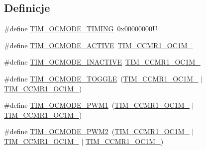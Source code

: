 \subsection*{Definicje}
\begin{DoxyCompactItemize}
\item 
\#define \hyperlink{group___t_i_m___output___compare__and___p_w_m__modes_gafae6b98b4b854fbfffd9a5ebc59c8f61}{T\+I\+M\+\_\+\+O\+C\+M\+O\+D\+E\+\_\+\+T\+I\+M\+I\+NG}~0x00000000U
\item 
\#define \hyperlink{group___t_i_m___output___compare__and___p_w_m__modes_ga111d1023e3ac6ef5544775c3863b4b12}{T\+I\+M\+\_\+\+O\+C\+M\+O\+D\+E\+\_\+\+A\+C\+T\+I\+VE}~\hyperlink{group___peripheral___registers___bits___definition_ga410a4752a98081bad8ab3f72b28e7c5f}{T\+I\+M\+\_\+\+C\+C\+M\+R1\+\_\+\+O\+C1\+M\+\_}
\item 
\#define \hyperlink{group___t_i_m___output___compare__and___p_w_m__modes_ga890fbb44fd16f2bce962983352d23f53}{T\+I\+M\+\_\+\+O\+C\+M\+O\+D\+E\+\_\+\+I\+N\+A\+C\+T\+I\+VE}~\hyperlink{group___peripheral___registers___bits___definition_ga8b5f6ec25063483641d6dc065d96d2b5}{T\+I\+M\+\_\+\+C\+C\+M\+R1\+\_\+\+O\+C1\+M\+\_}
\item 
\#define \hyperlink{group___t_i_m___output___compare__and___p_w_m__modes_ga368f80fad76018e2bf76084522e47536}{T\+I\+M\+\_\+\+O\+C\+M\+O\+D\+E\+\_\+\+T\+O\+G\+G\+LE}~(\hyperlink{group___peripheral___registers___bits___definition_ga8b5f6ec25063483641d6dc065d96d2b5}{T\+I\+M\+\_\+\+C\+C\+M\+R1\+\_\+\+O\+C1\+M\+\_} $\vert$ \hyperlink{group___peripheral___registers___bits___definition_ga410a4752a98081bad8ab3f72b28e7c5f}{T\+I\+M\+\_\+\+C\+C\+M\+R1\+\_\+\+O\+C1\+M\+\_})
\item 
\#define \hyperlink{group___t_i_m___output___compare__and___p_w_m__modes_ga766271da571888dfecd9130c3887e9c6}{T\+I\+M\+\_\+\+O\+C\+M\+O\+D\+E\+\_\+\+P\+W\+M1}~(\hyperlink{group___peripheral___registers___bits___definition_gac024f6b9972b940925ab5786ee38701b}{T\+I\+M\+\_\+\+C\+C\+M\+R1\+\_\+\+O\+C1\+M\+\_} $\vert$ \hyperlink{group___peripheral___registers___bits___definition_ga8b5f6ec25063483641d6dc065d96d2b5}{T\+I\+M\+\_\+\+C\+C\+M\+R1\+\_\+\+O\+C1\+M\+\_})
\item 
\#define \hyperlink{group___t_i_m___output___compare__and___p_w_m__modes_ga88ce4251743c2c07e19fdd5a0a310580}{T\+I\+M\+\_\+\+O\+C\+M\+O\+D\+E\+\_\+\+P\+W\+M2}~(\hyperlink{group___peripheral___registers___bits___definition_gac024f6b9972b940925ab5786ee38701b}{T\+I\+M\+\_\+\+C\+C\+M\+R1\+\_\+\+O\+C1\+M\+\_} $\vert$ \hyperlink{group___peripheral___registers___bits___definition_ga8b5f6ec25063483641d6dc065d96d2b5}{T\+I\+M\+\_\+\+C\+C\+M\+R1\+\_\+\+O\+C1\+M\+\_} $\vert$ \hyperlink{group___peripheral___registers___bits___definition_ga410a4752a98081bad8ab3f72b28e7c5f}{T\+I\+M\+\_\+\+C\+C\+M\+R1\+\_\+\+O\+C1\+M\+\_})

\end{DoxyCompactItemize}
